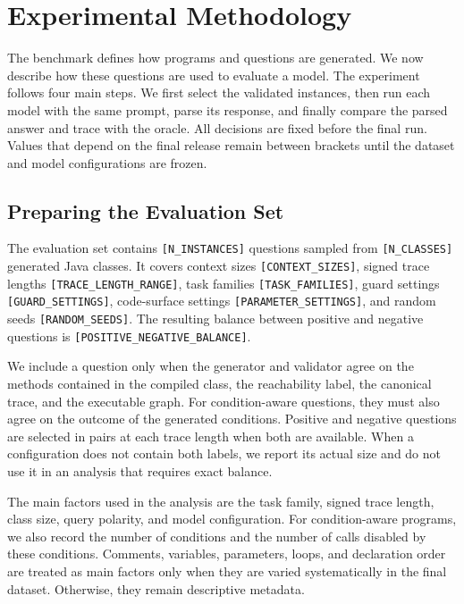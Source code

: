 \section{Experimental Methodology}
\label{sec:methodology}

The benchmark defines how programs and questions are generated. We now describe how these questions are used to evaluate a model. The experiment follows four main steps. We first select the validated instances, then run each model with the same prompt, parse its response, and finally compare the parsed answer and trace with the oracle. All decisions are fixed before the final run. Values that depend on the final release remain between brackets until the dataset and model configurations are frozen.

\subsection{Preparing the Evaluation Set}
\label{subsec:evaluation-set}

The evaluation set contains \texttt{[N\_INSTANCES]} questions sampled from \texttt{[N\_CLASSES]} generated Java classes. It covers context sizes \texttt{[CONTEXT\_SIZES]}, signed trace lengths \texttt{[TRACE\_LENGTH\_RANGE]}, task families \texttt{[TASK\_FAMILIES]}, guard settings \texttt{[GUARD\_SETTINGS]}, code-surface settings \texttt{[PARAMETER\_SETTINGS]}, and random seeds \texttt{[RANDOM\_SEEDS]}. The resulting balance between positive and negative questions is \texttt{[POSITIVE\_NEGATIVE\_BALANCE]}.

We include a question only when the generator and validator agree on the methods contained in the compiled class, the reachability label, the canonical trace, and the executable graph. For condition-aware questions, they must also agree on the outcome of the generated conditions. Positive and negative questions are selected in pairs at each trace length when both are available. When a configuration does not contain both labels, we report its actual size and do not use it in an analysis that requires exact balance.

The main factors used in the analysis are the task family, signed trace length, class size, query polarity, and model configuration. For condition-aware programs, we also record the number of conditions and the number of calls disabled by these conditions. Comments, variables, parameters, loops, and declaration order are treated as main factors only when they are varied systematically in the final dataset. Otherwise, they remain descriptive metadata.

